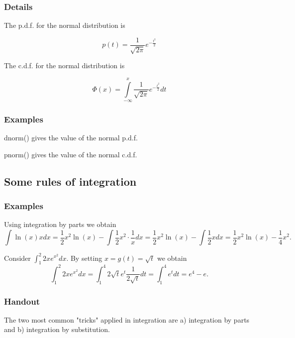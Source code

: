 \documentclass[12pt,a4paper]{article}
\theoremstyle{regla}
\theoremstyle{remark}
\theoremstyle{definition}
\theoremstyle{nonumberbreak}
\begin{document}
\subsubsection{Details}
The p.d.f. for the normal distribution is


$$p(t)=\frac{1}{\sqrt{2\pi}}e^{-\frac{t^2}{2}}$$

The c.d.f. for the normal distribution is


$$\Phi(x)=\int\limits_{-\infty}^x\frac{1}{\sqrt{2\pi}}e^{-\frac{t^2}{2}}dt$$



\subsubsection{Examples}
\begin{xmpl}
dnorm() gives the value of the normal p.d.f.
\end{xmpl}
\begin{xmpl}
pnorm() gives the value of the normal c.d.f.
\end{xmpl}

\subsection{Some rules of integration}
\subsubsection{Examples}
\begin{xmpl}

Using integration by parts we obtain 
$$\int \ln(x)x dx= \frac{1}{2}x^2\ln(x)-\int \frac{1}{2}x^2\cdot \frac{1}{x} dx = \frac{1}{2}x^2\ln(x)-\int \frac{1}{2}x dx=\frac{1}{2}x^2\ln(x)-\frac{1}{4}x^2.$$
\end{xmpl}

\begin{xmpl}
Consider $\int_1^2 2xe^{x^2} dx$. By setting $x=g(t)=\sqrt{t}$ we obtain 
$$\int_1^2 2xe^{x^2} dx = \int_1^4 2\sqrt{t}e^{t}\frac{1}{2\sqrt{t}}dt=\int_1^4 e^t dt=e^4-e.$$
\end{xmpl}
\subsubsection{Handout}
The two most common "tricks" applied in integration are a) integration by parts and b) integration by substitution.\\
\end{document}
